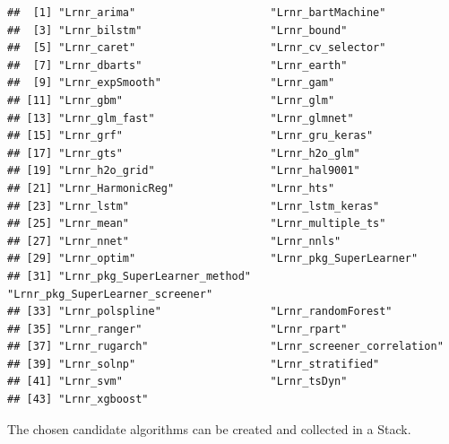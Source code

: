\documentclass[
]{book}
\newenvironment{Shaded}{\begin{snugshade}}{\end{snugshade}}
\newcommand{\AttributeTok}[1]{\textcolor[rgb]{0.77,0.63,0.00}{#1}}
\newcommand{\CommentTok}[1]{\textcolor[rgb]{0.56,0.35,0.01}{\textit{#1}}}
\newcommand{\DecValTok}[1]{\textcolor[rgb]{0.00,0.00,0.81}{#1}}
\newcommand{\FunctionTok}[1]{\textcolor[rgb]{0.00,0.00,0.00}{#1}}
\newcommand{\NormalTok}[1]{#1}
\newcommand{\OtherTok}[1]{\textcolor[rgb]{0.56,0.35,0.01}{#1}}
\newcommand{\SpecialCharTok}[1]{\textcolor[rgb]{0.00,0.00,0.00}{#1}}
\begin{document}
\begin{verbatim}
##  [1] "Lrnr_arima"                     "Lrnr_bartMachine"              
##  [3] "Lrnr_bilstm"                    "Lrnr_bound"                    
##  [5] "Lrnr_caret"                     "Lrnr_cv_selector"              
##  [7] "Lrnr_dbarts"                    "Lrnr_earth"                    
##  [9] "Lrnr_expSmooth"                 "Lrnr_gam"                      
## [11] "Lrnr_gbm"                       "Lrnr_glm"                      
## [13] "Lrnr_glm_fast"                  "Lrnr_glmnet"                   
## [15] "Lrnr_grf"                       "Lrnr_gru_keras"                
## [17] "Lrnr_gts"                       "Lrnr_h2o_glm"                  
## [19] "Lrnr_h2o_grid"                  "Lrnr_hal9001"                  
## [21] "Lrnr_HarmonicReg"               "Lrnr_hts"                      
## [23] "Lrnr_lstm"                      "Lrnr_lstm_keras"               
## [25] "Lrnr_mean"                      "Lrnr_multiple_ts"              
## [27] "Lrnr_nnet"                      "Lrnr_nnls"                     
## [29] "Lrnr_optim"                     "Lrnr_pkg_SuperLearner"         
## [31] "Lrnr_pkg_SuperLearner_method"   "Lrnr_pkg_SuperLearner_screener"
## [33] "Lrnr_polspline"                 "Lrnr_randomForest"             
## [35] "Lrnr_ranger"                    "Lrnr_rpart"                    
## [37] "Lrnr_rugarch"                   "Lrnr_screener_correlation"     
## [39] "Lrnr_solnp"                     "Lrnr_stratified"               
## [41] "Lrnr_svm"                       "Lrnr_tsDyn"                    
## [43] "Lrnr_xgboost"
\end{verbatim}

The chosen candidate algorithms can be created and collected in a Stack.

\begin{Shaded}
\end{Shaded}
\end{document}
